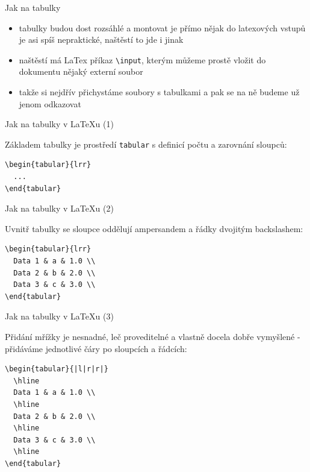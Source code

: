 \documentclass{beamer}
\begin{document}
\begin{frame}[fragile]{Jak na tabulky}
  \begin{itemize}
    \item tabulky budou dost rozsáhlé a montovat je přímo nějak do latexových vstupů je asi spíš nepraktické, naštěstí to jde i jinak
    \item naštěstí má LaTex příkaz \texttt{\textbackslash{}input}, kterým můžeme prostě vložit do dokumentu nějaký externí soubor
    \item takže si nejdřív přichystáme soubory s tabulkami a pak se na ně budeme už jenom odkazovat
  \end{itemize}
\end{frame}

\begin{frame}[fragile]{Jak na tabulky v LaTeXu (1)}
  \begin{block}{ }
    Základem tabulky je prostředí \texttt{tabular} s definicí počtu a zarovnání sloupců:
    \scriptsize
    \begin{verbatim}
\begin{tabular}{lrr}
  ...
\end{tabular}
    \end{verbatim}
  \end{block}
\end{frame}

\begin{frame}[fragile]{Jak na tabulky v LaTeXu (2)}
  \begin{block}{ }
    Uvnitř tabulky se sloupce oddělují ampersandem a řádky dvojitým backslashem:
    \scriptsize
    \begin{verbatim}
\begin{tabular}{lrr}
  Data 1 & a & 1.0 \\
  Data 2 & b & 2.0 \\
  Data 3 & c & 3.0 \\
\end{tabular}
    \end{verbatim}
  \end{block}
\end{frame}

\begin{frame}[fragile]{Jak na tabulky v LaTeXu (3)}
  \begin{block}{ }
    Přidání mřížky je nesnadné, leč proveditelné a vlastně docela dobře vymyšlené - přidáváme jednotlivé čáry po sloupcích a řádcích:
    \scriptsize
    \begin{verbatim}
\begin{tabular}{|l|r|r|}
  \hline
  Data 1 & a & 1.0 \\
  \hline
  Data 2 & b & 2.0 \\
  \hline
  Data 3 & c & 3.0 \\
  \hline
\end{tabular}
    \end{verbatim}
  \end{block}
\end{frame}
\end{document}
